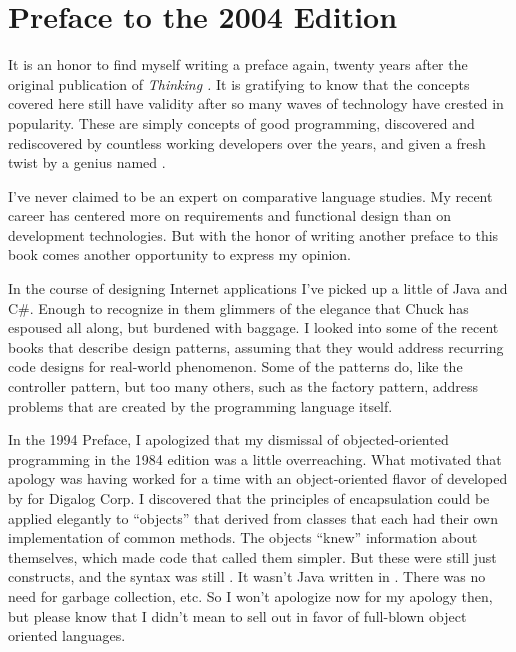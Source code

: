 \chapter*{Preface to the 2004 Edition}
\pagestyle{headings}

\initial It is an honor to find myself writing a preface again, twenty years
after the original publication of \emph{Thinking \Forth{}.} It is gratifying to
know that the concepts covered here still have validity after so many
waves of technology have crested in popularity. These are simply
concepts of good programming, discovered and rediscovered by countless
working developers over the years, and given a fresh twist by a genius
named .

I've never claimed to be an expert on comparative language studies. My
recent career has centered more on requirements and functional design
than on development technologies. But with the honor of writing
another preface to this book comes another opportunity to express my
opinion.

In the course of designing Internet applications I've picked up a
little of Java and C\#. Enough to recognize in them glimmers of the
elegance that Chuck has espoused all along, but burdened with
baggage. I looked into some of the recent books that describe design
patterns, assuming that they would address recurring code designs for
real-world phenomenon. Some of the patterns do, like the controller
pattern, but too many others, such as the factory pattern, address
problems that are created by the programming language itself.

In the 1994 Preface, I apologized that my dismissal of
objected-oriented programming in the 1984 edition was a little
overreaching. What motivated that apology was having worked for a time
with an object-oriented flavor of \Forth{} developed by  for Digalog Corp. I discovered that the principles of
encapsulation could be applied elegantly to \Forth{} ``objects'' that
derived from classes that each had their own implementation of common
methods. The objects ``knew'' information about themselves, which made
code that called them simpler. But these were still just \Forth{}
constructs, and the syntax was still \Forth{}. It wasn't Java written
in \Forth{}. There was no need for garbage collection, etc. So I won't
apologize now for my apology then, but please know that I didn't mean
to sell out in favor of full-blown object oriented languages.

